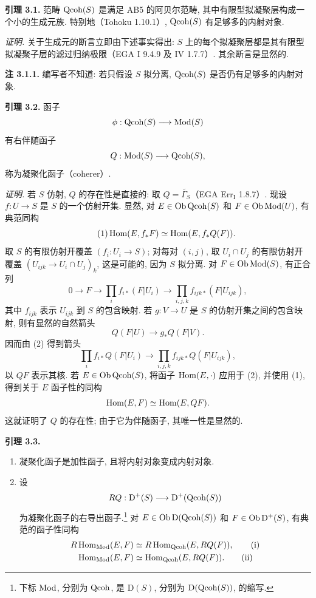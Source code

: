 \textbf{引理 3.1.} 范畴 $\operatorname{Qcoh}(S)$ 是满足 AB5 的阿贝尔范畴, 其中有限型拟凝聚层构成一个小的生成元族. 特别地（Tohoku 1.10.1）, $\operatorname{Qcoh}(S)$ 有足够多的内射对象.

\emph{证明.} 关于生成元的断言立即由下述事实得出: $S$ 上的每个拟凝聚层都是其有限型拟凝聚子层的滤过归纳极限（EGA I 9.4.9 及 IV 1.7.7）. 其余断言是显然的.

\textbf{注 3.1.1.} 编写者不知道: 若只假设 $S$ 拟分离, $\operatorname{Qcoh}(S)$ 是否仍有足够多的内射对象.

\textbf{引理 3.2.} 函子
\[
 \phi:\operatorname{Qcoh}(S)\longrightarrow\operatorname{Mod}(S)
\]
有右伴随函子
\[
 Q:\operatorname{Mod}(S)\longrightarrow\operatorname{Qcoh}(S),
\]
称为凝聚化函子（coherer）.

\emph{证明.} 若 $S$ 仿射, $Q$ 的存在性是直接的: 取 $Q=\widetilde{\Gamma_S}$（EGA Err$_{\mathrm I}$ 1.8.7）. 现设 $f:U\to S$ 是 $S$ 的一个仿射开集. 显然, 对 $E\in\operatorname{Ob}\operatorname{Qcoh}(S)$ 和 $F\in\operatorname{Ob}\operatorname{Mod}(U)$, 有典范同构
\begin{equation}\tag{1}
 \operatorname{Hom}(E,f_*F)\simeq \operatorname{Hom}(E,f_*Q(F)).
\end{equation}
取 $S$ 的有限仿射开覆盖 $(f_i:U_i\to S)$; 对每对 $(i,j)$, 取 $U_i\cap U_j$ 的有限仿射开覆盖 $(U_{ijk}\to U_i\cap U_j)_k$, 这是可能的, 因为 $S$ 拟分离. 对 $F\in\operatorname{Ob}\operatorname{Mod}(S)$, 有正合列
\begin{equation}\tag{2}
 0\longrightarrow F\longrightarrow \prod_i f_{i*}(F|U_i)
 \longrightarrow \prod_{i,j,k}f_{ijk*}(F|U_{ijk}),
\end{equation}
其中 $f_{ijk}$ 表示 $U_{ijk}$ 到 $S$ 的包含映射. 若 $g:V\to U$ 是 $S$ 的仿射开集之间的包含映射, 则有显然的自然箭头
\[
 Q(F|U)\longrightarrow g_*Q(F|V).
\]
因而由 (2) 得到箭头
\begin{equation}\tag{3}
 \prod_i f_{i*}Q(F|U_i)\longrightarrow
 \prod_{i,j,k}f_{ijk*}Q(F|U_{ijk}),
\end{equation}
以 $QF$ 表示其核. 若 $E\in\operatorname{Ob}\operatorname{Qcoh}(S)$, 将函子 $\operatorname{Hom}(E,\cdot)$ 应用于 (2), 并使用 (1), 得到关于 $E$ 函子性的同构
\[
 \operatorname{Hom}(E,F)\simeq\operatorname{Hom}(E,QF).
\]
这就证明了 $Q$ 的存在性; 由于它为伴随函子, 其唯一性是显然的.

\textbf{引理 3.3.} \begin{enumerate}[label=\alph*)]
\item 凝聚化函子是加性函子, 且将内射对象变成内射对象.
\item 设
\[
 RQ:\mathrm D^+(S)\longrightarrow \mathrm D^+(\operatorname{Qcoh}(S))
\]
为凝聚化函子的右导出函子.\footnote{下标 $\operatorname{Mod}$, 分别为 $\operatorname{Qcoh}$, 是 $\mathrm D(S)$, 分别为 $\mathrm D(\operatorname{Qcoh}(S))$, 的缩写.} 对 $E\in\operatorname{Ob}\mathrm D(\operatorname{Qcoh}(S))$ 和 $F\in\operatorname{Ob}\mathrm D^+(S)$, 有典范的函子性同构
\begin{align}
 R\operatorname{Hom}_{\operatorname{Mod}}(E,F)&\simeq R\operatorname{Hom}_{\operatorname{Qcoh}}(E,RQ(F)), \tag{i}\\
 \operatorname{Hom}_{\operatorname{Mod}}(E,F)&\simeq \operatorname{Hom}_{\operatorname{Qcoh}}(E,RQ(F)). \tag{ii}
\end{align}
\end{enumerate}

